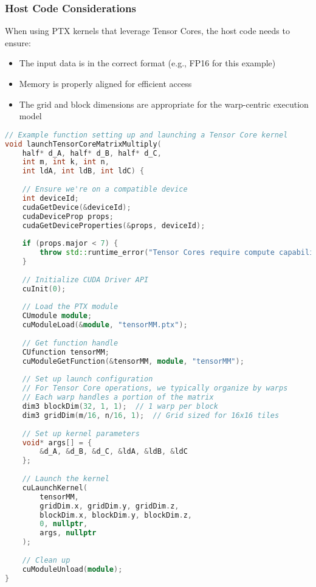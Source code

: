 \subsubsection{Host Code Considerations}

When using PTX kernels that leverage Tensor Cores, the host code needs to ensure:

\begin{itemize}
    \item The input data is in the correct format (e.g., FP16 for this example)
    \item Memory is properly aligned for efficient access
    \item The grid and block dimensions are appropriate for the warp-centric execution model
\end{itemize}

\begin{lstlisting}[language=C++]
// Example function setting up and launching a Tensor Core kernel
void launchTensorCoreMatrixMultiply(
    half* d_A, half* d_B, half* d_C,
    int m, int k, int n,
    int ldA, int ldB, int ldC) {
    
    // Ensure we're on a compatible device
    int deviceId;
    cudaGetDevice(&deviceId);
    cudaDeviceProp props;
    cudaGetDeviceProperties(&props, deviceId);
    
    if (props.major < 7) {
        throw std::runtime_error("Tensor Cores require compute capability 7.0+");
    }
    
    // Initialize CUDA Driver API
    cuInit(0);
    
    // Load the PTX module
    CUmodule module;
    cuModuleLoad(&module, "tensorMM.ptx");
    
    // Get function handle
    CUfunction tensorMM;
    cuModuleGetFunction(&tensorMM, module, "tensorMM");
    
    // Set up launch configuration
    // For Tensor Core operations, we typically organize by warps
    // Each warp handles a portion of the matrix
    dim3 blockDim(32, 1, 1);  // 1 warp per block
    dim3 gridDim(m/16, n/16, 1);  // Grid sized for 16x16 tiles
    
    // Set up kernel parameters
    void* args[] = {
        &d_A, &d_B, &d_C, &ldA, &ldB, &ldC
    };
    
    // Launch the kernel
    cuLaunchKernel(
        tensorMM,
        gridDim.x, gridDim.y, gridDim.z,
        blockDim.x, blockDim.y, blockDim.z,
        0, nullptr,
        args, nullptr
    );
    
    // Clean up
    cuModuleUnload(module);
}
\end{lstlisting}

